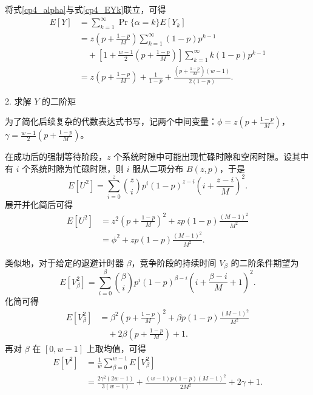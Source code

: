     将式\eqref{cp4_alpha}与式\eqref{cp4_EYk}联立，可得
    \begin{equation}\label{cp4_EY}
        \begin{aligned}
        E[Y] &= \sum_{k=1}^{\infty} \Pr\{\alpha = k\} E[Y_k] \\
        &= z \left( p + \frac{1-p}{M} \right) \sum_{k=1}^{\infty} (1-p) p^{k-1} \\
        &\quad + \left[ 1 + \frac{w-1}{2} \left( p + \frac{1-p}{M} \right) \right] \sum_{k=1}^{\infty} k (1-p) p^{k-1} \\
        &= z \left( p + \frac{1-p}{M} \right) + \frac{1}{1-p} + \frac{\left( p + \frac{1-p}{M} \right) (w-1)}{2(1-p)}.
        \end{aligned}
    \end{equation}

2. 求解 $Y$ 的二阶矩

    为了简化后续复杂的代数表达式书写，记两个中间变量：$\phi=z\left(p+\frac{1-p}{M}\right)$，$\gamma=\frac{w-1}{2}\left(p+\frac{1-p}{M}\right)$。

    在成功后的强制等待阶段，$z$ 个系统时隙中可能出现忙碌时隙和空闲时隙。设其中有 $i$ 个系统时隙为忙碌时隙，则 $i$ 服从二项分布 $B(z,p)$，于是
    \begin{equation}
        E[U^2] = \sum_{i=0}^{z} \binom{z}{i} p^i (1-p)^{z-i} \left(i + \frac{z-i}{M}\right)^2.
    \end{equation}
    展开并化简后可得
    \begin{equation}
        \begin{aligned}
            E[U^2] &= z^2\left(p + \frac{1-p}{M}\right)^2 + zp(1-p)\frac{(M-1)^2}{M^2} \\
                   &= \phi^2 + zp(1-p)\frac{(M-1)^2}{M^2}.
        \end{aligned}
    \end{equation}

    类似地，对于给定的退避计时器 $\beta$，竞争阶段的持续时间 $V_\beta$ 的二阶条件期望为
    \begin{equation}
        E[V_\beta^2] = \sum_{i=0}^{\beta} \binom{\beta}{i} p^i (1-p)^{\beta-i} \left(i + \frac{\beta-i}{M} + 1\right)^2.
    \end{equation}
    化简可得
    \begin{equation}
        \begin{aligned}
            E[V_\beta^2] &= \beta^2\left(p + \frac{1-p}{M}\right)^2 + \beta p(1-p)\frac{(M-1)^2}{M^2} \\
                         &\quad + 2\beta\left(p + \frac{1-p}{M}\right) + 1.
        \end{aligned}
    \end{equation}
再对 $\beta$ 在 $[0,w-1]$ 上取均值，可得
    \begin{equation}
        \begin{aligned}
            E[V^2] &= \frac{1}{w}\sum_{\beta=0}^{w-1} E[V_\beta^2] \\
                   &= \frac{2\gamma^2(2w-1)}{3(w-1)} + \frac{(w-1)p(1-p)(M-1)^2}{2M^2} + 2\gamma + 1.
        \end{aligned}
    \end{equation}


